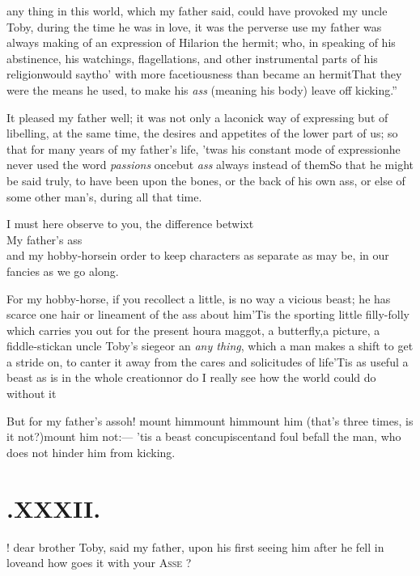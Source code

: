 \documentclass{article}
\begin{document}
 any thing in this world, which my\break
father said, could have provoked my uncle Toby, during the
time he was in love, it was the perverse use my father was always
making of an expression of Hilarion the hermit; who, in
speaking of his abstinence, his watchings, flagellations, and other
instrumental parts of his religion\tsk would say\tsk tho’
with more facetiousness than became an
hermit\tsk \lqq That they were the means he used, to make
his \textit{ass} (meaning his body) leave off
kicking.”

It pleased my father well; it was not only a laconick way of
expressing\tsh\break
but of libelling, at the same time, the desires and appetites of
the lower part of us; so that for many years of my father’s
life, ’twas his constant mode of expression\tsk he never used
the word \textit{passions} once\tsk but \textit{ass} always
instead of them\tsh So that he might be said truly, to have been
upon the bones, or the back of his own ass, or else of some
other man’s, during all that time.

I must here observe to you, the difference betwixt\\
\null\qquad My father’s ass\\
\null\qquad and my hobby-horse\tsk in order to keep
characters as separate as may be, in our fancies as we go
along.

For my hobby-horse, if you recollect a little, is no way a
vicious beast; he has scarce one hair or lineament of the ass about
him\tsh ’Tis the sporting little filly-folly which
carries you out for the present hour\tsk a
maggot, a butterfly,\break a
picture, a fiddle-stick\tsk an uncle Toby’s
siege\tsk or an \textit{any thing}, which a man makes a shift to
get a stride on, to canter it away from the cares and solicitudes
of life\tsk ’Tis as useful a beast as is in the whole
creation\tsk nor do I really see how the world could do without
it\tsh

\noindent
\tsh But for my father’s ass\tsh oh!
mount him\tsk mount him\tsk mount him\tsk \break
(that’s three times, is it not?)\tsk mount him not:— ’tis a beast
concupiscent\tsk and foul befall the man, who does not hinder him
from kicking.

\vfill{}\eject\null
\section{.\enspace XXXII.}

! dear brother Toby, said\break
my father, upon his first seeing him after he fell in
love\tsk and how goes it with your \textsc{Asse} ?
\end{document}
